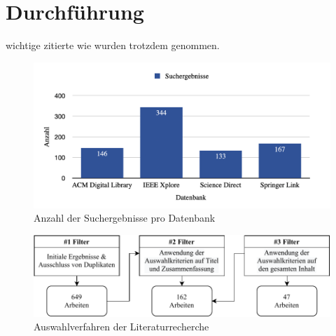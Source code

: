 \section{Durchführung}

wichtige zitierte wie \cite{nunes_systematic_2017} wurden trotzdem genommen.

\begin{figure}
    \centering
    \includegraphics[width=0.75\linewidth]{contents/04_literature_review/res/database_results.png}
    \caption{Anzahl der Suchergebnisse pro Datenbank}
    \label{fig:04_literature_review_screening_process}
\end{figure}

\begin{figure}
    \centering
    \includegraphics{contents/04_literature_review/res/selection_process.pdf}
    \caption{Auswahlverfahren der Literaturrecherche}
    \label{fig:04_literature_review_selection_process}
\end{figure}